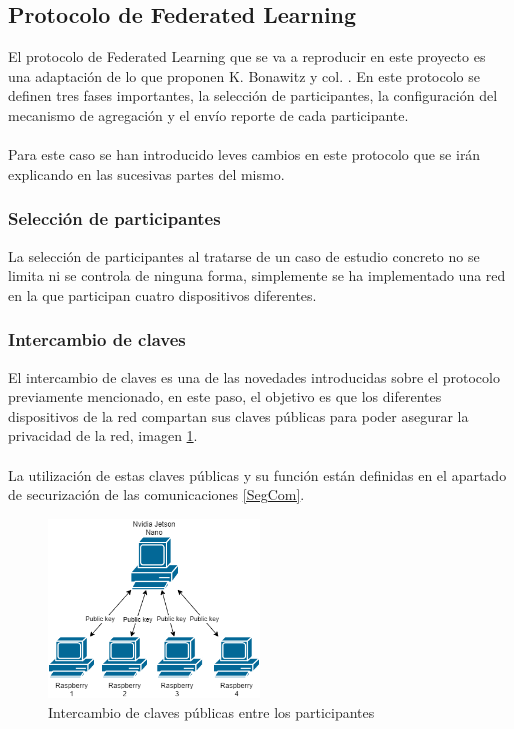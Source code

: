 \subsection{Protocolo de Federated Learning}\label{Protocolo}
El protocolo de Federated Learning que se va a reproducir en este proyecto es una adaptación de lo que proponen K. Bonawitz y col. \autocite{bonawitzFederatedLearningScale2019a}. En este protocolo se definen tres fases importantes, la selección de participantes, la configuración del mecanismo de agregación y el envío reporte de cada participante.
\\\\
Para este caso se han introducido leves cambios en este protocolo que se irán explicando en las sucesivas partes del mismo.  

\subsubsection{Selección de participantes}
La selección de participantes al tratarse de un caso de estudio concreto no se limita ni se controla de ninguna forma, simplemente se ha implementado una red en la que participan cuatro dispositivos diferentes.

\subsubsection{Intercambio de claves}
El intercambio de claves es una de las novedades introducidas sobre el protocolo previamente mencionado, en este paso, el objetivo es que los diferentes dispositivos de la red compartan sus claves públicas para poder asegurar la privacidad de la red, imagen \ref{fig:PublicKeyShare}. 
\\ \\
La utilización de estas claves públicas y su función están definidas en el apartado de securización de las comunicaciones \ref{SegCom}.
\begin{figure}[H]
    \centering
    \includegraphics[width=0.5\textwidth]{Figuras/Network_public_key.png}    
    \caption{Intercambio de claves públicas entre los participantes} 
    \label{fig:PublicKeyShare}
\end{figure}

